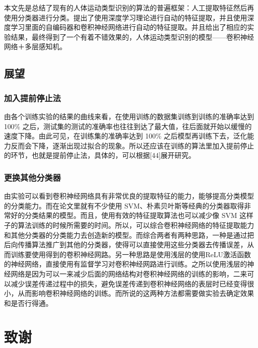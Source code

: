 本文先是总结了现有的人体运动类型识别的算法的普遍框架：人工提取特征然后再使用分类器进行分类。提出了使用深度学习理论进行自动的特征提取，并且使用深度学习里面的自编码器和卷积神经网络进行自动的特征提取。并且给出了相应的实验结果，最终得到了一个有着不错效果的，人体运动类型识别的模型------卷积神经网络＋多层感知机。

\subsection{展望}\label{ux5c55ux671b}

\subsubsection{加入提前停止法}\label{ux52a0ux5165ux63d0ux524dux505cux6b62ux6cd5}

由各个训练实验的结果的曲线来看，在使用训练的数据集训练到训练的准确率达到
100\%
之后，测试集的测试的准确率也往往到达了最大值，往后面就开始以缓慢的速度下降。由此可见，在训练集的准确率达到
100\%
之后模型再训练下去，泛化能力反而会下降，逐渐出现过拟合的现象。所以还应该在训练的算法里加入提前停止的环节，也就是提前停止法，具体的，可以根据{[}44{]}展开研究。

\subsubsection{更换其他分类器}\label{ux66f4ux6362ux5176ux4ed6ux5206ux7c7bux5668}

由实验可以看到卷积神经网络具有非常优良的提取特征的能力，能够提高分类模型的分类能力。而在论文里就有不少使用
SVM、朴素贝叶斯等经典的分类器取得非常好的分类结果的模型。而且，使用有效的特征提取算法也可以减少像
SVM
这样子的算法训练的时候所需要的时间。所以，可以综合卷积神经网络的特征提取能力和其他分类器的分类能力去创造新的模型。而综合两者有两种思路，一种是通过把后向传播算法推广到其他的分类器，使得可以直接使用这些分类器去传播误差，从而训练要使用得到的卷积神经网路。另一种思路是使用浅层的使用ReLU激活函数的神经网络，直接使用有监督学习对卷积神经网路进行训练。之所以使用浅层的神经网络是因为可以一来减少后面的网络结构对卷积神经网络的训练的影响，二来可以减少误差传递过程中的损失，避免误差传递到卷积神经网络的表层时已经变得很小，从而影响卷积神经网络的训练。而所说的这两种方法都需要做实验去确定效果和是否行得通。

\section{致谢}\label{ux81f4ux8c22}

